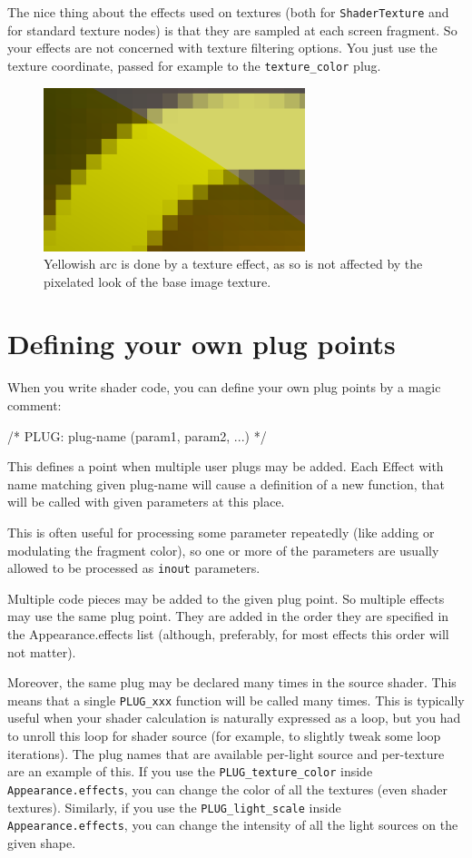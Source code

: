 \documentclass{acmsiggraph}                     %
\newenvironment{mycode}
{\begin{mycodecore}}
{\end{mycodecore}
\vspace{-0.1in}}
\begin{document}
The nice thing about the effects used on textures (both for \texttt{ShaderTexture}
and for standard texture nodes) is that they are sampled at each
screen fragment. So your effects are not concerned with texture filtering
options. You just use the texture coordinate, passed for example to the
\texttt{texture\_color} plug.

\begin{figure}[H]
  \centering
  \includegraphics[width=3in]{shader_texture_no_filtering_problems}
  \caption{Yellowish arc is done by a texture effect, as so is not
    affected by the pixelated look of the base image texture.}
\end{figure}

\section{Defining your own plug points}

When you write shader code, you can define your own plug points by a
magic comment:

\begin{mycode}
/* PLUG: plug-name (param1, param2, ...) */
\end{mycode}

This defines a point when multiple user plugs may be added. Each
Effect with name matching given plug-name will cause a
definition of a new function, that will be called with given parameters
at this place.

This is often useful for processing some parameter
repeatedly (like adding or modulating the fragment color),
so one or more of the parameters are usually allowed to be processed
as \texttt{inout} parameters.

Multiple code pieces may be added to the given plug point.
So multiple effects may use the same plug point. They are added
in the order they are specified in the Appearance.effects list
(although, preferably, for most effects this order will not matter).

Moreover, the same plug may be declared many times in the source shader.
This means that a single \texttt{PLUG\_xxx} function will be called
many times. This is typically useful when your shader calculation is naturally
expressed as a loop, but you had to unroll this loop for shader source
(for example, to slightly tweak some loop iterations).
The plug names that are available per-light source and per-texture
are an example of this. If you use the \texttt{PLUG\_texture\_color}
inside \texttt{Appearance.effects}, you can change the color of all
the textures (even shader textures).
Similarly, if you use the \texttt{PLUG\_light\_scale}
inside \texttt{Appearance.effects}, you can change the intensity
of all the light sources on the given shape.
\end{document}
